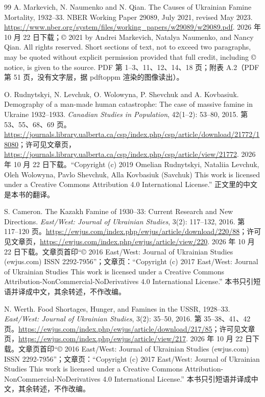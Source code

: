 \begin{thebibliography}{99}
 A. Markevich, N. Naumenko and N. Qian. The Causes of Ukrainian Famine Mortality, 1932--33. NBER Working Paper 29089, July 2021, revised May 2023. \url{https://www.nber.org/system/files/working_papers/w29089/w29089.pdf}. 2026 年 10 月 22 日下载；© 2021 by Andrei Markevich, Natalya Naumenko, and Nancy Qian. All rights reserved. Short sections of text, not to exceed two paragraphs, may be quoted without explicit permission provided that full credit, including © notice, is given to the source. PDF 第 1--3、11、12、14、18 页；附表 A.2（PDF 第 51 页，没有文字层，据 pdftoppm 渲染的图像读出）。

 O. Rudnytskyi, N. Levchuk, O. Wolowyna, P. Shevchuk and A. Kovbasiuk. Demography of a man-made human catastrophe: The case of massive famine in Ukraine 1932--1933. \emph{Canadian Studies in Population}, 42(1--2): 53--80, 2015. 第 53、55、68、69 页。\url{https://journals.library.ualberta.ca/csp/index.php/csp/article/download/21772/18080}；许可见文章页，\url{https://journals.library.ualberta.ca/csp/index.php/csp/article/view/21772}. 2026 年 10 月 22 日下载。“Copyright (c) 2019 Omelian Rudnytskyi, Nataliia Levchuk, Oleh Wolowyna, Pavlo Shevchuk, Alla Kovbasiuk (Savchuk) This work is licensed under a Creative Commons Attribution 4.0 International License.” 正文里的中文是本书的翻译。

 S. Cameron. The Kazakh Famine of 1930--33: Current Research and New Directions. \emph{East/West: Journal of Ukrainian Studies}, 3(2): 117--132, 2016. 第 117--120 页。\url{https://ewjus.com/index.php/ewjus/article/download/220/88}；许可见文章页，\url{https://ewjus.com/index.php/ewjus/article/view/220}. 2026 年 10 月 22 日下载。文章页首印“© 2016 East/West: Journal of Ukrainian Studies (ewjus.com) ISSN 2292-7956”；文章页：“Copyright (c) 2017 East/West: Journal of Ukrainian Studies This work is licensed under a Creative Commons Attribution-NonCommercial-NoDerivatives 4.0 International License.” 本书只引短语并译成中文，其余转述，不作改编。

 N. Werth. Food Shortages, Hunger, and Famines in the USSR, 1928--33. \emph{East/West: Journal of Ukrainian Studies}, 3(2): 35--50, 2016. 第 35--38、41、42 页。\url{https://ewjus.com/index.php/ewjus/article/download/217/85}；许可见文章页，\url{https://ewjus.com/index.php/ewjus/article/view/217}. 2026 年 10 月 22 日下载。文章页首印“© 2016 East/West: Journal of Ukrainian Studies (ewjus.com) ISSN 2292-7956”；文章页：“Copyright (c) 2017 East/West: Journal of Ukrainian Studies This work is licensed under a Creative Commons Attribution-NonCommercial-NoDerivatives 4.0 International License.” 本书只引短语并译成中文，其余转述，不作改编。


\end{thebibliography}
